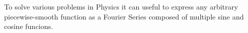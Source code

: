\documentclass{article}
\begin{document}
To solve various problems in Physics  it can useful to express any arbitrary piecewise-smooth function as a Fourier Series  composed of multiple sine and cosine funcions.

\printindex
\end{document}
